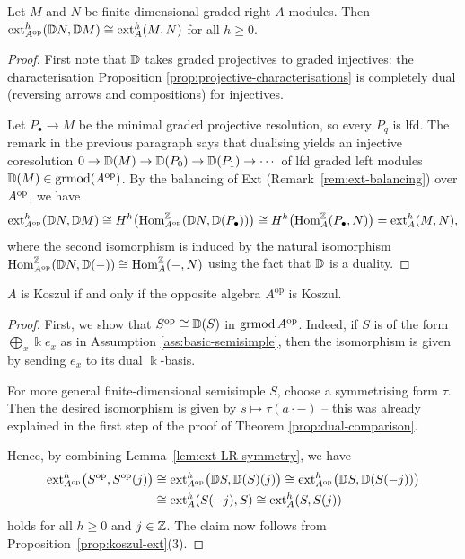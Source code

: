 \begin{lemma}\label{lem:ext-LR-symmetry}
Let $M$ and $N$ be finite-dimensional graded right $A$-modules.
Then $\operatorname{ext}\nolimits_{A^{\mathrm{op}}}^h(\mathbb{D} N,\mathbb{D} M)\cong\operatorname{ext}\nolimits_A^h(M,N)$ for all $h\geq0$.
\end{lemma}

\begin{supplementary}
\begin{proof}
First note that $\mathbb{D}$ takes graded projectives to graded injectives: the characterisation Proposition \ref{prop:projective-characterisations} is completely dual (reversing arrows and compositions) for injectives.

Let $P_\bullet\to M$ be the minimal graded projective resolution, so every $P_q$ is lfd.
The remark in the previous paragraph says that dualising yields an injective coresolution $0\to\mathbb{D}(M)\to\mathbb{D}(P_0)\to\mathbb{D}(P_1)\to\cdots$ of lfd graded left modules $\mathbb{D}(M)\in \operatorname{\mathrm{grmod}}(A^{\mathrm{op}})$.
By the balancing of Ext (Remark~\ref{rem:ext-balancing}) over $A^{\mathrm{op}}$, we have 
\[\operatorname{ext}\nolimits_{A^{\mathrm{op}}}^h(\mathbb{D} N,\mathbb{D} M)\cong H^h\bigl(\operatorname{Hom}\nolimits_{A^{\mathrm{op}}}^{\mathbb{Z}}(\mathbb{D} N,\mathbb{D}(P_\bullet))\bigr) \cong H^h\bigl(\operatorname{Hom}\nolimits_A^{\mathbb{Z}}(P_\bullet,N)\bigr)= \operatorname{ext}\nolimits_A^h(M,N),
\]
where the second isomorphism is induced by the natural isomorphism $\operatorname{Hom}\nolimits_{A^{\mathrm{op}}}^{\mathbb{Z}}(\mathbb{D} N,\mathbb{D}(-))\cong\operatorname{Hom}\nolimits_A^{\mathbb{Z}}(-,N)$ using the fact that $\mathbb{D}$ is a duality.
\end{proof}
\end{supplementary}
\begin{proposition}\label{prop:opposite-koszul}
$A$ is Koszul if and only if the opposite algebra $A^{\mathrm{op}}$ is Koszul.
\end{proposition}

\begin{proof}
First, we show that $S^{\mathrm{op}} \cong \mathbb{D}(S)$ in $\operatorname{\mathrm{grmod}} A^{\mathrm{op}}$.
Indeed, if $S$ is of the form $\bigoplus_x \Bbbk e_x$ as in Assumption \ref{ass:basic-semisimple}, then the isomorphism is given by sending $e_x$ to its dual $\Bbbk$-basis.
\begin{advanced}
For more general finite-dimensional semisimple $S$, choose a symmetrising form $\tau$.  Then the desired isomorphism is given by $s\mapsto \tau(a\cdot-)$ -- this was already explained in the first step of the proof of Theorem \ref{prop:dual-comparison}.
\end{advanced}

Hence, by combining Lemma~\ref{lem:ext-LR-symmetry}, we have 
\begin{align*}
\operatorname{ext}\nolimits_{A^{\mathrm{op}}}^h\bigl(S^{\mathrm{op}},S^{\mathrm{op}}(j)\bigr) &\cong 
\operatorname{ext}\nolimits_{A^{\mathrm{op}}}^h\bigl(\mathbb{D} S,\mathbb{D}(S)(j)\bigr) \cong 
\operatorname{ext}\nolimits_{A^{\mathrm{op}}}^h\bigl(\mathbb{D} S,\mathbb{D}(S(-j))\bigr)\\
&\cong 
\operatorname{ext}\nolimits_{A}^h(S(-j),S)\cong 
\operatorname{ext}\nolimits_{A}^h(S,S(j))
\end{align*}
holds for all $h\geq0$ and $j\in\mathbb{Z}$.
The claim now follows from Proposition~\ref{prop:koszul-ext}(3).
\end{proof}

